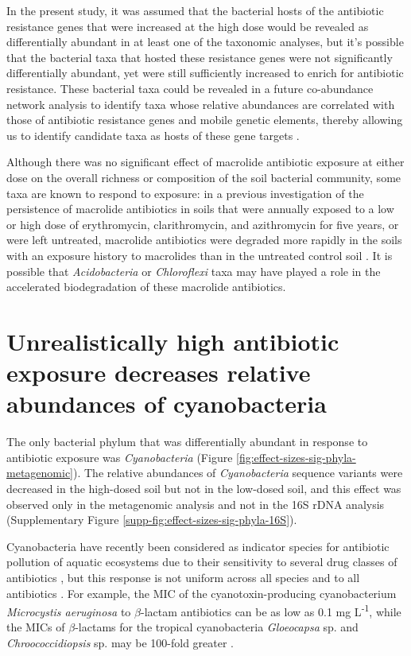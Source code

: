 In the present study, it was assumed that the bacterial hosts of the antibiotic resistance genes that were increased at the high dose would be revealed as differentially abundant in at least one of the taxonomic analyses, but it's possible that the bacterial taxa that hosted these resistance genes were not significantly differentially abundant, yet were still sufficiently increased to enrich for antibiotic resistance.
These bacterial taxa could be revealed in a future co-abundance network analysis to identify taxa whose relative abundances are correlated with those of antibiotic resistance genes and mobile genetic elements, thereby allowing us to identify candidate taxa as hosts of these gene targets \parencite{Forsberg.2014}.

Although there was no significant effect of macrolide antibiotic exposure at either dose on the overall richness or composition of the soil bacterial community, some taxa are known to respond to exposure:
in a previous investigation of the persistence of macrolide antibiotics in soils that were annually exposed to a low or high dose of erythromycin, clarithromycin, and azithromycin for five years, or were left untreated, macrolide antibiotics were degraded more rapidly in the soils with an exposure history to macrolides than in the untreated control soil \parencite{Topp.2016}.
It is possible that \textit{Acidobacteria} or \textit{Chloroflexi} taxa may have played a role in the accelerated biodegradation of these macrolide antibiotics.

\section{Unrealistically high antibiotic exposure decreases relative abundances of cyanobacteria}

The only bacterial phylum that was differentially abundant in response to antibiotic exposure was \textit{Cyanobacteria} (Figure \ref{fig:effect-sizes-sig-phyla-metagenomic}).
The relative abundances of \textit{Cyanobacteria} sequence variants were decreased in the high-dosed soil but not in the low-dosed soil, and this effect was observed only in the metagenomic analysis and not in the 16S rDNA analysis (Supplementary Figure \ref{supp-fig:effect-sizes-sig-phyla-16S}).

Cyanobacteria have recently been considered as indicator species for antibiotic pollution of aquatic ecosystems due to their sensitivity to several drug classes of antibiotics \parencite{CommitteeforMedicinalProductsforHumanUse.2015, LePage.2017}, but this response is not uniform across all species and to all antibiotics \parencite{LePage.2017, Dias.2015}.
For example, the MIC of the cyanotoxin-producing cyanobacterium \textit{Microcystis aeruginosa} to $\beta$-lactam antibiotics can be as low as 0.1 mg L\textsuperscript{-1}, while the MICs of $\beta$-lactams for the tropical cyanobacteria \textit{Gloeocapsa} sp. and \textit{Chroococcidiopsis} sp. may be 100-fold greater \parencite{Dias.2015, Reynaud.1986}.

